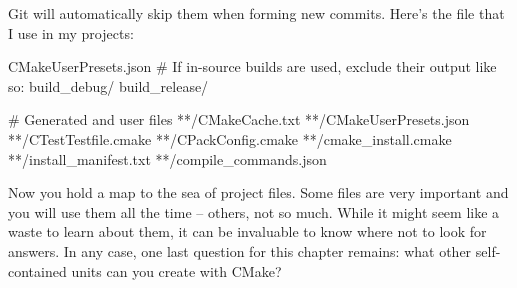 Git will automatically skip them when forming new commits. Here’s the file that I use in my projects:


\begin{shell}
CMakeUserPresets.json
# If in-source builds are used, exclude their output like so:
build_debug/
build_release/

# Generated and user files
**/CMakeCache.txt
**/CMakeUserPresets.json
**/CTestTestfile.cmake
**/CPackConfig.cmake
**/cmake_install.cmake
**/install_manifest.txt
**/compile_commands.json
\end{shell}

Now you hold a map to the sea of project files. Some files are very important and you will use them all the time – others, not so much. While it might seem like a waste to learn about them, it can be invaluable to know where not to look for answers. In any case, one last question for this chapter remains: what other self-contained units can you create with CMake?





























